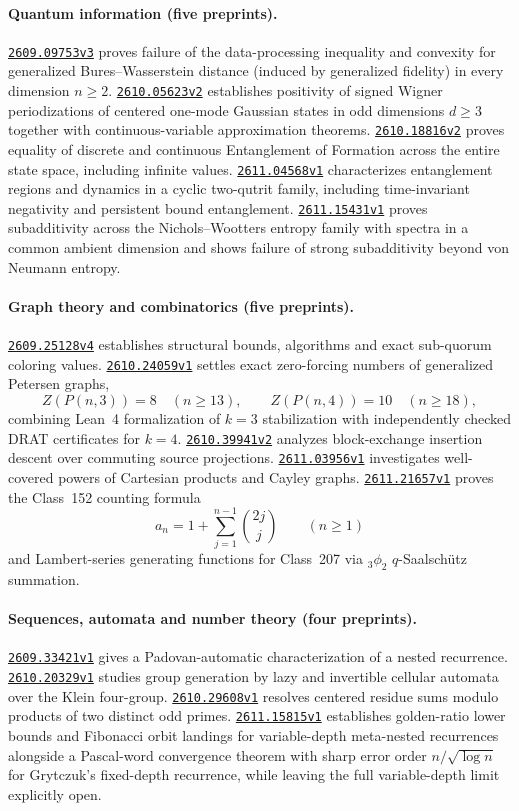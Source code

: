\documentclass[11pt,a4paper]{article}
\newcommand{\arxiv}[1]{\href{https://arxiv.org/abs/#1}{\texttt{#1}}}
\begin{document}
\paragraph{Quantum information (five preprints).}
\arxiv{2609.09753v3} proves failure of the data-processing inequality and
convexity for generalized Bures--Wasserstein distance (induced by generalized
fidelity) in every dimension $n\ge2$. \arxiv{2610.05623v2} establishes
positivity of signed Wigner periodizations of centered one-mode Gaussian states
in odd dimensions $d\ge3$ together with continuous-variable approximation
theorems. \arxiv{2610.18816v2} proves equality of discrete and continuous
Entanglement of Formation across the entire state space, including infinite
values. \arxiv{2611.04568v1} characterizes entanglement regions and dynamics in
a cyclic two-qutrit family, including time-invariant negativity and persistent
bound entanglement. \arxiv{2611.15431v1} proves subadditivity across the
Nichols--Wootters entropy family with spectra in a common ambient dimension and
shows failure of strong subadditivity beyond von Neumann entropy.

\paragraph{Graph theory and combinatorics (five preprints).}
\arxiv{2609.25128v4} establishes structural bounds, algorithms and exact
sub-quorum coloring values. \arxiv{2610.24059v1} settles exact zero-forcing
numbers of generalized Petersen graphs,
\[
 Z(P(n,3))=8\quad(n\ge13),\qquad Z(P(n,4))=10\quad(n\ge18),
\]
combining Lean~4 formalization of $k=3$ stabilization with independently checked
DRAT certificates for $k=4$. \arxiv{2610.39941v2} analyzes block-exchange
insertion descent over commuting source projections. \arxiv{2611.03956v1}
investigates well-covered powers of Cartesian products and Cayley graphs.
\arxiv{2611.21657v1} proves the Class~152 counting formula
\[
 a_n=1+\sum_{j=1}^{n-1}\binom{2j}{j}\qquad(n\ge1)
\]
and Lambert-series generating functions for Class~207 via ${}_3\phi_2$
$q$-Saalsch\"utz summation.

\paragraph{Sequences, automata and number theory (four preprints).}
\arxiv{2609.33421v1} gives a Padovan-automatic characterization of a nested
recurrence. \arxiv{2610.20329v1} studies group generation by lazy and
invertible cellular automata over the Klein four-group. \arxiv{2610.29608v1}
resolves centered residue sums modulo products of two distinct odd primes.
\arxiv{2611.15815v1} establishes golden-ratio lower bounds and Fibonacci orbit
landings for variable-depth meta-nested recurrences alongside a Pascal-word
convergence theorem with sharp error order $n/\sqrt{\log n}$ for Grytczuk's
fixed-depth recurrence, while leaving the full variable-depth limit explicitly
open.
\end{document}
